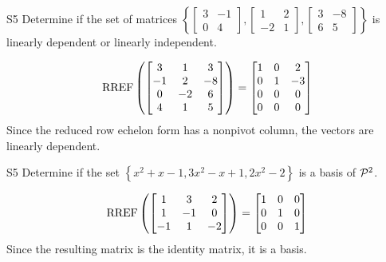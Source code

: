 \begin{problem}{S5}
Determine if the set of matrices $\left\{\begin{bmatrix} 3 & -1 \\ 0 & 4 \end{bmatrix}, \begin{bmatrix} 1  & 2 \\ -2 & 1 \end{bmatrix}, \begin{bmatrix} 3 & -8 \\ 6 & 5 \end{bmatrix} \right\}$  is linearly dependent or linearly independent.
\end{problem}
\begin{solution}
$$\RREF\left(\begin{bmatrix} 3 & 1 & 3 \\ -1 & 2 & -8 \\ 0 & -2 & 6 \\ 4 & 1 & 5 \end{bmatrix} \right) = \begin{bmatrix} 1 & 0 & 2 \\ 0 & 1 & -3 \\ 0 & 0 & 0 \\ 0 & 0 & 0 \end{bmatrix}$$
Since the reduced row echelon form has a nonpivot column, the vectors are linearly dependent.
\end{solution}

\begin{problem}{S5}
Determine if the set $\left\{ x^2+x-1, 3x^2-x+1, 2x^2-2 \right\}$ is a basis of $\P^2$.
\end{problem}
\begin{solution}
$$\RREF\left(\begin{bmatrix} 1 & 3 & 2 \\ 1 & -1 & 0 \\ -1 & 1 & -2 \end{bmatrix} \right)= \begin{bmatrix} 1 & 0 &0 \\ 0 & 1 & 0 \\ 0 & 0 & 1\end{bmatrix}$$
Since the resulting matrix is the identity matrix, it is a basis.
\end{solution}


